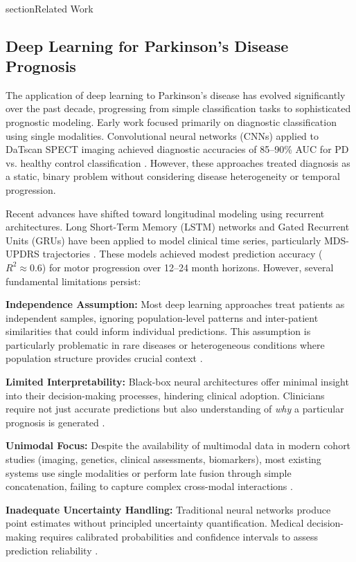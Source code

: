 \documentclass[conference]{IEEEtran}
\begin{document}
\\section{Related Work}

\subsection{Deep Learning for Parkinson's Disease Prognosis}

The application of deep learning to Parkinson's disease has evolved significantly over the past decade, progressing from simple classification tasks to sophisticated prognostic modeling. Early work focused primarily on diagnostic classification using single modalities. Convolutional neural networks (CNNs) applied to DaTscan SPECT imaging achieved diagnostic accuracies of 85--90\% AUC for PD vs. healthy control classification \cite{Hett2019}. However, these approaches treated diagnosis as a static, binary problem without considering disease heterogeneity or temporal progression.

Recent advances have shifted toward longitudinal modeling using recurrent architectures. Long Short-Term Memory (LSTM) networks and Gated Recurrent Units (GRUs) have been applied to model clinical time series, particularly MDS-UPDRS trajectories \cite{ElGazzar2019}. These models achieved modest prediction accuracy ($R^2 \approx 0.6$) for motor progression over 12--24 month horizons. However, several fundamental limitations persist:

\textbf{Independence Assumption:} Most deep learning approaches treat patients as independent samples, ignoring population-level patterns and inter-patient similarities that could inform individual predictions. This assumption is particularly problematic in rare diseases or heterogeneous conditions where population structure provides crucial context \cite{Shu2021}.

\textbf{Limited Interpretability:} Black-box neural architectures offer minimal insight into their decision-making processes, hindering clinical adoption. Clinicians require not just accurate predictions but also understanding of \textit{why} a particular prognosis is generated \cite{Holzinger2019}.

\textbf{Unimodal Focus:} Despite the availability of multimodal data in modern cohort studies (imaging, genetics, clinical assessments, biomarkers), most existing systems use single modalities or perform late fusion through simple concatenation, failing to capture complex cross-modal interactions \cite{Baltrusaitis2019}.

\textbf{Inadequate Uncertainty Handling:} Traditional neural networks produce point estimates without principled uncertainty quantification. Medical decision-making requires calibrated probabilities and confidence intervals to assess prediction reliability \cite{Guo2017}.
\end{document}
